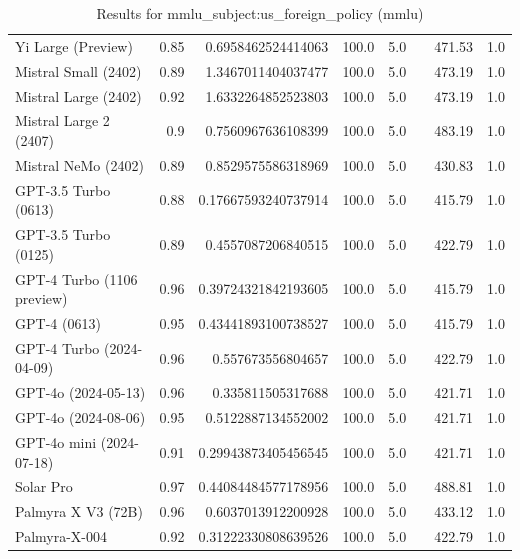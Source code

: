 \begin{table}[htp]
{\begin{tabular}{lrrrrrrr}
Yi Large (Preview) & 0.85 & 0.6958462524414063 & 100.0 & 5.0 &  & 471.53 & 1.0 \\
Mistral Small (2402) & 0.89 & 1.3467011404037477 & 100.0 & 5.0 &  & 473.19 & 1.0 \\
Mistral Large (2402) & 0.92 & 1.6332264852523803 & 100.0 & 5.0 &  & 473.19 & 1.0 \\
Mistral Large 2 (2407) & 0.9 & 0.7560967636108399 & 100.0 & 5.0 &  & 483.19 & 1.0 \\
Mistral NeMo (2402) & 0.89 & 0.8529575586318969 & 100.0 & 5.0 &  & 430.83 & 1.0 \\
GPT-3.5 Turbo (0613) & 0.88 & 0.17667593240737914 & 100.0 & 5.0 &  & 415.79 & 1.0 \\
GPT-3.5 Turbo (0125) & 0.89 & 0.4557087206840515 & 100.0 & 5.0 &  & 422.79 & 1.0 \\
GPT-4 Turbo (1106 preview) & 0.96 & 0.39724321842193605 & 100.0 & 5.0 &  & 415.79 & 1.0 \\
GPT-4 (0613) & 0.95 & 0.43441893100738527 & 100.0 & 5.0 &  & 415.79 & 1.0 \\
GPT-4 Turbo (2024-04-09) & 0.96 & 0.557673556804657 & 100.0 & 5.0 &  & 422.79 & 1.0 \\
GPT-4o (2024-05-13) & 0.96 & 0.335811505317688 & 100.0 & 5.0 &  & 421.71 & 1.0 \\
GPT-4o (2024-08-06) & 0.95 & 0.5122887134552002 & 100.0 & 5.0 &  & 421.71 & 1.0 \\
GPT-4o mini (2024-07-18) & 0.91 & 0.29943873405456545 & 100.0 & 5.0 &  & 421.71 & 1.0 \\
Solar Pro & 0.97 & 0.44084484577178956 & 100.0 & 5.0 &  & 488.81 & 1.0 \\
Palmyra X V3 (72B) & 0.96 & 0.6037013912200928 & 100.0 & 5.0 &  & 433.12 & 1.0 \\
Palmyra-X-004 & 0.92 & 0.31222330808639526 & 100.0 & 5.0 &  & 422.79 & 1.0 \\
\bottomrule
\end{tabular}}
\caption{Results for mmlu_subject:us_foreign_policy (mmlu)}
\label{fig:mmlu_subject:us_foreign_policy (mmlu)}
\end{table}